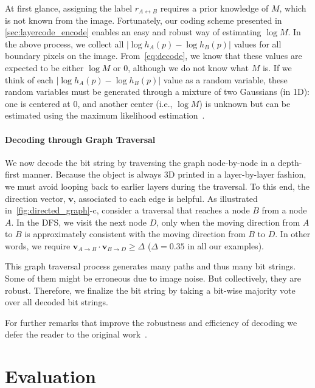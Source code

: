 \documentclass[12pt]{report}
\begin{document}
At first glance, assigning the label $r_{A\leftrightarrow B}$ requires a prior knowledge
of $M$, which is not known from the image.
Fortunately, our coding scheme presented in \ref{sec:layercode_encode} enables an easy and robust way of estimating
$\log M$. In the above process, we collect all
$|\log h_A(p) - \log h_B(p)|$ values for all boundary pixels on the image.
From~\ref{eq:decode}, we know that these values are expected to be either $\log M$ or 0, although
we do not know what $M$ is. If we think of each $|\log h_A(p) - \log h_B(p)|$ value
as a random variable, these random variables must be generated through a
mixture of two Gaussians (in 1D):
one is centered at 0, and another center (i.e., $\log M$)
is unknown but can be estimated using the maximum likelihood estimation~\cite{nasrabadi2007pattern}.


\paragraph{Decoding through Graph Traversal}\label{sec:graph_traversal}
We now decode the bit string by traversing the graph node-by-node in a depth-first manner.
Because the object is always 3D printed in a layer-by-layer fashion, we must
avoid looping back to earlier layers during the traversal.
To this end, the direction vector, $\bm{v}$, associated to each edge is helpful.
As illustrated in~\ref{fig:directed_graph}-c, consider a traversal that
reaches a node $B$ from a node $A$. In the DFS, we visit the next node $D$, only
when the moving direction from $A$ to $B$ is approximately consistent with
the moving direction from $B$ to $D$. In other words, we require
$\bm{v}_{A\to B}\cdot \bm{v}_{B\to D} \ge \Delta$ ($\Delta=0.35$ in all our examples).

This graph traversal process generates many paths and thus many bit strings.
Some of them might be erroneous due to image noise. But collectively, they are robust.
Therefore, we finalize the bit string by taking a bit-wise majority vote over all decoded bit strings.

For further remarks that improve the robustness and efficiency of decoding we defer the reader to
the original work~\cite{Maia:2019}.

\section{Evaluation}\label{sec:layercode_eval}
\end{document}
